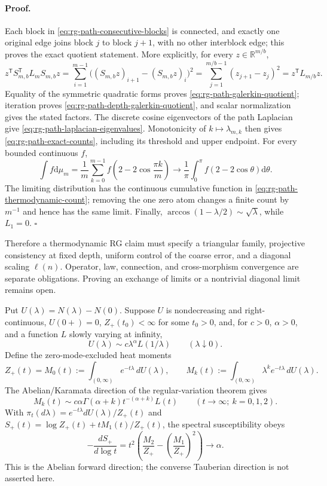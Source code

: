 \paragraph{Proof.}
Each block in \eqref{eq:rg-path-consecutive-blocks} is connected, and exactly
one original edge joins block \(j\) to block \(j+1\), with no other interblock
edge; this proves the exact quotient statement.  More explicitly, for every
\(z\in\mathbb R^{m/b}\),
\[
z^{\mathsf T}S_{m,b}^{\mathsf T}L_mS_{m,b}z
=\sum_{i=1}^{m-1}\bigl((S_{m,b}z)_{i+1}-(S_{m,b}z)_i\bigr)^2
=\sum_{j=1}^{m/b-1}(z_{j+1}-z_j)^2
=z^{\mathsf T}L_{m/b}z.
\]
Equality of the symmetric quadratic forms proves
\eqref{eq:rg-path-galerkin-quotient}; iteration proves
\eqref{eq:rg-path-depth-galerkin-quotient}, and scalar normalization gives the
stated factors.  The discrete cosine
eigenvectors of the path Laplacian give
\eqref{eq:rg-path-laplacian-eigenvalues}.  Monotonicity of \(k\mapsto
\lambda_{m,k}\) then gives \eqref{eq:rg-path-exact-counts}, including its
threshold and upper endpoint.  For every bounded continuous \(f\),
\[
\int f\mathrm{d}\mu_m
=\frac1m\sum_{k=0}^{m-1}
f\left(2-2\cos\frac{\pi k}{m}\right)
\longrightarrow
\frac1\pi\int_0^\pi f(2-2\cos\theta)\mathrm{d}\theta .
\]
The limiting distribution has the continuous cumulative function in
\eqref{eq:rg-path-thermodynamic-count}; removing the one zero atom changes a
finite count by \(m^{-1}\) and hence has the same limit.  Finally,
\(\arccos(1-\lambda/2)\sim\sqrt\lambda\), while \(L_1=0\).
\(\square\)

Therefore a thermodynamic RG claim must specify a triangular family,
projective consistency at fixed depth, uniform control of the coarse error,
and a diagonal scaling \(\ell(n)\). Operator, law, connection, and
cross-morphism convergence are separate obligations. Proving an exchange of
limits or a nontrivial diagonal limit remains open. 

Put \(U(\lambda)=N(\lambda)-N(0)\). Suppose \(U\) is nondecreasing and
right-continuous, \(U(0+)=0\), \(Z_+(t_0)<\infty\) for some \(t_0>0\), and,
for \(c>0\), \(\alpha>0\), and a function \(L\) slowly varying at infinity,
\[
U(\lambda)\sim c\lambda^\alpha L(1/\lambda)
\qquad(\lambda\downarrow0).
\]
Define the zero-mode-excluded heat moments
\[
Z_+(t)=M_0(t):=\int_{(0,\infty)}e^{-t\lambda}\,dU(\lambda),
\qquad
M_k(t):=\int_{(0,\infty)}\lambda^k e^{-t\lambda}\,dU(\lambda).
\]
The Abelian/Karamata direction of the regular-variation theorem
\citep[\S1.7.1]{BinghamGoldieTeugels1987} gives
\[
M_k(t)\sim c\alpha\Gamma(\alpha+k)t^{-(\alpha+k)}L(t)
\qquad(t\to\infty;\ k=0,1,2).
\]
With \(\pi_t(d\lambda)=e^{-t\lambda}dU(\lambda)/Z_+(t)\) and
\(S_+(t)=\log Z_+(t)+tM_1(t)/Z_+(t)\), the spectral susceptibility obeys
\begin{equation}
-\frac{dS_+}{d\log t}
=t^2\left(\frac{M_2}{Z_+}-\left(\frac{M_1}{Z_+}\right)^2\right)
\longrightarrow\alpha.
\label{eq:rg-heat-susceptibility}
\end{equation}
This is the Abelian forward direction; the converse Tauberian direction is not
asserted here. 

